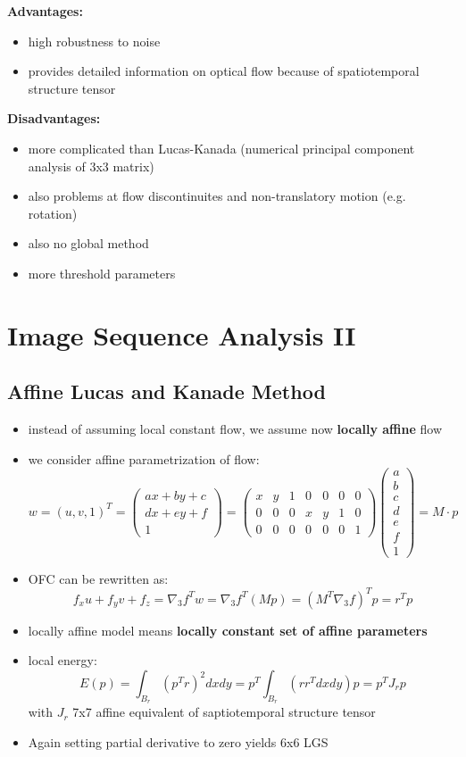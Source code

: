 \documentclass[11pt]{article}
\begin{document}
\textbf{Advantages:}
\begin{itemize}
\item high robustness to noise
\item provides detailed information on optical flow because of spatiotemporal structure tensor
\end{itemize}
\textbf{Disadvantages:}
\begin{itemize}
\item more complicated than Lucas-Kanada (numerical principal component analysis of 3x3 matrix)
\item also problems at flow discontinuites and non-translatory motion (e.g. rotation)
\item also no global method
\item more threshold parameters
\end{itemize}

\section{Image Sequence Analysis II}
\label{sec-4}
\subsection{Affine Lucas and Kanade Method}
\label{sec-4-1}
\begin{itemize}
\item instead of assuming local constant flow, we assume now \textbf{locally affine} flow
\item we consider affine parametrization of flow:
     \[ w = (u,v,1)^T = \begin{pmatrix} ax+by+c \\ dx+ey+f \\ 1 \end{pmatrix}
          = \begin{pmatrix} x&y&1&0&0&0&0 \\ 0&0&0&x&y&1&0 \\ 0&0&0&0&0&0&1 
        \end{pmatrix} \begin{pmatrix} a\\b\\c\\d\\e\\f\\1 \end{pmatrix} = M\cdot p\]
\item OFC can be rewritten as:
     \[ f_xu+f_yv+f_z = \nabla_3 f^T w = \nabla_3 f^T (Mp) = (M^T\nabla_3f)^Tp = r^Tp \]
\item locally affine model means \textbf{locally constant set of affine parameters}
\item local energy:
\[ E(p) = \int_{B_r}(p^Tr)^2 dxdy = p^T\int_{B_r}(rr^T dx dy)p = p^T J_r p  \]
with $J_r$ 7x7 affine equivalent of saptiotemporal structure tensor
\item Again setting partial derivative to zero yields 6x6 LGS
\end{itemize}
\end{document}
